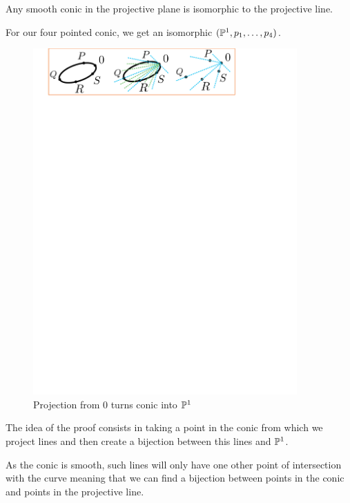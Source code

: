 \documentclass[12pt]{memoir}
\begin{document}
\begin{Prop}%
    Any smooth conic in the projective plane is isomorphic to the projective line.
\end{Prop}

For our four pointed conic, we get an isomorphic $(\mathbb{P}^1,p_1,\dots,p_4)$. 

\begin{figure}[h!]
        \centering
        \includegraphics[width=0.9\textwidth, trim= 1.32cm 24.9cm 5.2cm 0.1cm,clip]{../figs/FigsDNnotability3.pdf}
        \caption{Projection from $0$ turns conic into $\mathbb{P}^1$}
        \label{fig:smooth-conic-into-P1}
    \end{figure}
\begin{ptcb}

    The idea of the proof consists in taking a point in the conic from which we project lines and then create a bijection between this lines and $\mathbb{P}^1$.\par
    As the conic is smooth, such lines will only have one other point of intersection with the curve meaning that we can find a bijection between points in the conic and points in the projective line.
\end{ptcb}
\end{document}

